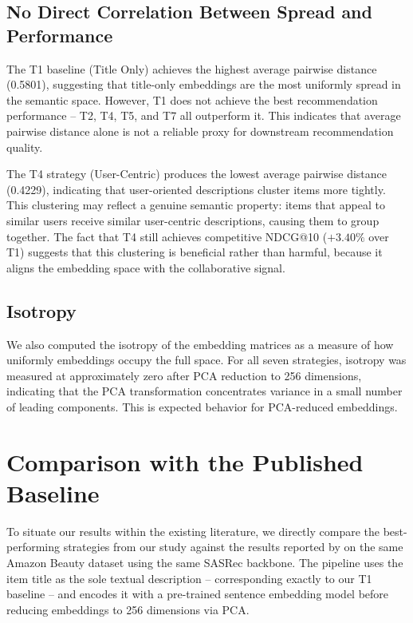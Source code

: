\documentclass[12pt,a4paper]{report}
\begin{document}
\subsection*{No Direct Correlation Between Spread and Performance}

\justifying
The T1 baseline (Title Only) achieves the highest average pairwise distance
(0.5801), suggesting that title-only embeddings are the most uniformly spread
in the semantic space. However, T1 does not achieve the best recommendation
performance -- T2, T4, T5, and T7 all outperform it. This indicates that
average pairwise distance alone is not a reliable proxy for downstream
recommendation quality.

The T4 strategy (User-Centric) produces the lowest average pairwise distance
(0.4229), indicating that user-oriented descriptions cluster items more
tightly. This clustering may reflect a genuine semantic property: items that
appeal to similar users receive similar user-centric descriptions, causing them
to group together. The fact that T4 still achieves competitive NDCG@10
(\(+3.40\%\) over T1) suggests that this clustering is beneficial rather than
harmful, because it aligns the embedding space with the collaborative signal.

\subsection*{Isotropy}

\justifying
We also computed the isotropy of the embedding matrices as a measure of how
uniformly embeddings occupy the full space. For all seven strategies, isotropy
was measured at approximately zero after PCA reduction to 256 dimensions,
indicating that the PCA transformation concentrates variance in a small number
of leading components. This is expected behavior for PCA-reduced embeddings.

\section{Comparison with the Published Baseline}
\label{sec:pc_vs_baseline}

\justifying
To situate our results within the existing literature, we directly compare the
best-performing strategies from our study against the results reported by
\citep{boz2025} on the same Amazon Beauty dataset using the same SASRec
backbone. The \citep{boz2025} pipeline uses the item title as the sole textual
description -- corresponding exactly to our T1 baseline -- and encodes it with a
pre-trained sentence embedding model before reducing embeddings to 256
dimensions via PCA.
\end{document}
